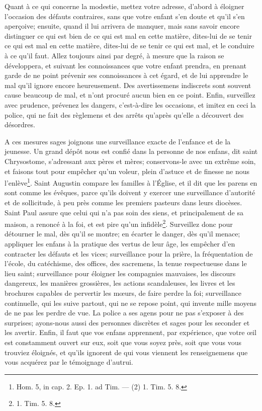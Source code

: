 \documentclass[instructions.tex]{subfiles}
\begin{document}
Quant à ce qui concerne la modestie, mettez votre adresse, d’abord à éloigner l’occasion des défauts contraires, sans que votre enfant s’en doute et qu’il s’en aperçoive; ensuite, quand il lui arrivera de manquer, mais sans savoir encore distinguer ce qui est bien de ce qui est mal en cette matière, dites-lui de se tenir ce qui est mal en cette matière, dites-lui de se tenir ce qui est mal, et le conduire à ce qu’il faut. Allez toujours ainsi par degré, à mesure que la raison se développera, et suivant les connoissances que votre enfant prendra, en prenant garde de ne point prévenir ses connoissances à cet égard, et de lui apprendre le mal qu’il ignore encore heureusement. Des avertissemens indiscrets sont souvent cause beaucoup de mal, et n’ont procuré aucun bien en ce point. Enfin, surveillez avec prudence, prévenez les dangers, c’est-à-dire les occasions, et imitez en ceci la police, qui ne fait des règlemens et des arrêts qu’après qu’elle a découvert des désordres.
 
\tertio A ces mesures sages joignons une surveillance exacte de l’enfance et de la jeunesse. Un grand dépôt nous est confié dans la personne de nos enfans, dit saint Chrysostome, s’adressant aux pères et mères; conservons-le avec un extrême soin, et faisons tout pour empêcher qu’un voleur, plein d’astuce et de finesse ne nous l’enlève\footnote{Hom. 5, in cap. 2. Ep. 1. ad Tim. — (2) 1. Tim. 5. 8.}. Saint Augustin compare les familles à l’Église, et il dit que les parens en sont comme les évêques, parce qu’ils doivent y exercer une surveillance d’autorité et de sollicitude, à peu près comme les premiers pasteurs dans leurs diocèses. Saint Paul assure que celui qui n’a pas soin des siens, et principalement de sa maison, a renoncé à la foi, et est pire qu’un infidèle\footnote{1. Tim. 5. 8.}. Surveillez donc pour détourner le mal, dès qu’il se montre; en écarter le danger, dès qu’il menace; appliquer les enfans à la pratique des vertus de leur âge, les empêcher d’en contracter les défauts et les vices; surveillance pour la prière, la fréquentation de l’école, du catéchisme, des offices, des sacremens, la tenue respectueuse dans le lieu saint; surveillance pour éloigner les compagnies mauvaises, les discours dangereux, les manières grossières, les actions scandaleuses, les livres et les brochures capables de pervertir les mœurs, de faire perdre la foi; surveillance continuelle, qui les suive partout, qui ne se repose point, qui invente mille moyens de ne pas les perdre de vue. La police a ses agens pour ne pas s’exposer à des surprises; ayons-nous aussi des personnes discrètes et sages pour les seconder et les avertir. Enfin, il faut que vos enfans apprennent, par expérience, que votre œil est constamment ouvert sur eux, soit que vous soyez près, soit que vous vous trouviez éloignés, et qu’ils ignorent de qui vous viennent les renseignemens que vous acquérez par le témoignage d’autrui.
 
\end{document}
